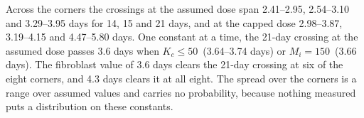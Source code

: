Across the corners the crossings at the assumed dose span 2.41--2.95, 2.54--3.10 and
3.29--3.95 days for 14, 15 and 21 days, and at the capped dose 2.98--3.87, 3.19--4.15 and
4.47--5.80 days. One constant at a time, the 21-day crossing at the assumed dose passes 3.6 days
when $K_c\le50$\uM\ (3.64--3.74 days) or $M_i=150$\uM\ (3.66 days). The fibroblast value of
3.6 days clears the 21-day crossing at six of the eight corners, and 4.3 days clears it at all
eight. The spread over the corners is a range over assumed values and carries no probability,
because nothing measured puts a distribution on these constants.

